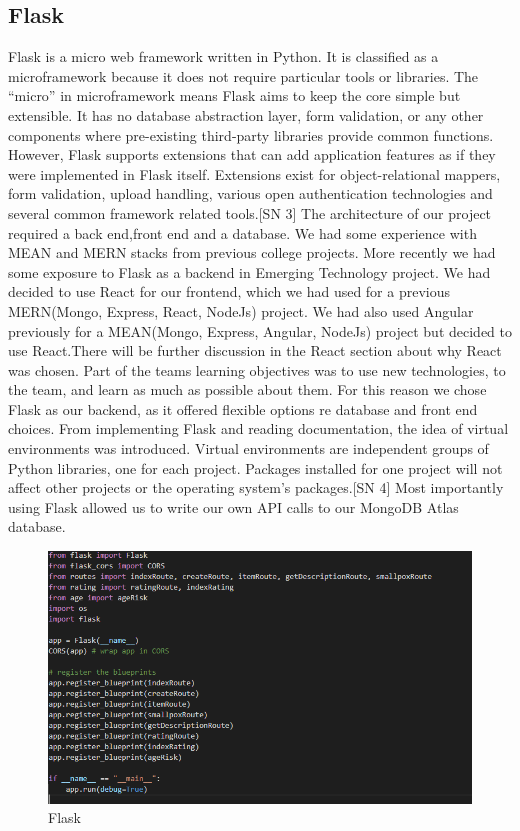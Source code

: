 \subsection{Flask}
Flask is a micro web framework written in Python. It is classified as a microframework because it does not require particular tools or libraries. The “micro” in microframework means Flask aims to keep the core simple but extensible. It has no database abstraction layer, form validation, or any other components where pre-existing third-party libraries provide common functions. However, Flask supports extensions that can add application features as if they were implemented in Flask itself. Extensions exist for object-relational mappers, form validation, upload handling, various open authentication technologies and several common framework related tools.[SN 3] 
The architecture of our project required a back end,front end and a database. We had some experience with MEAN and MERN stacks from previous college projects. More recently we had some exposure to Flask as a backend in Emerging Technology project. We had decided to use React for our frontend, which we had used for a previous MERN(Mongo, Express, React, NodeJs) project. We had also used Angular previously for a MEAN(Mongo, Express, Angular, NodeJs) project but decided to use React.There will be further discussion in the React section about why React was chosen. Part of the teams learning objectives was to use new technologies, to the team, and learn as much as possible about them. For this reason we chose Flask as our backend, as it offered flexible options re database and front end choices. From implementing Flask and reading documentation, the idea of virtual environments was introduced. Virtual environments are independent groups of Python libraries, one for each project. Packages installed for one project will not affect other projects or the operating system’s packages.[SN 4]
Most importantly using Flask allowed us to write our own API calls to our MongoDB Atlas database.

\begin{figure}
    \centering
    \includegraphics[scale=0.5]{img/flask.PNG}
    \caption{Flask}
    \label{fig:my_label2}
\end{figure}    
      














